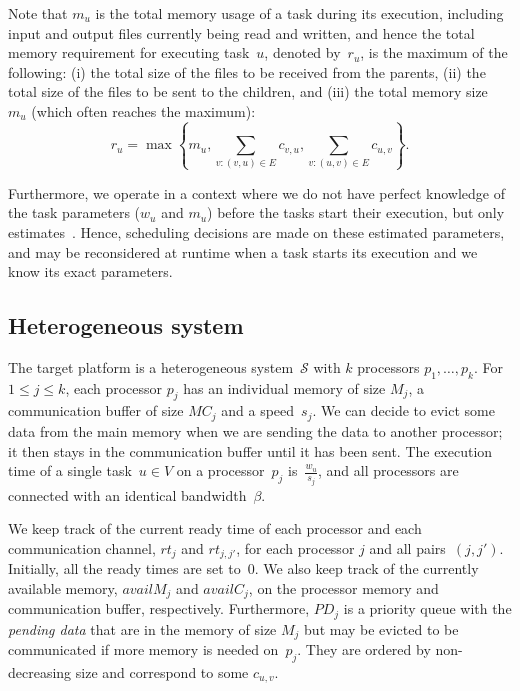 \documentclass[conference]{IEEEtran}
\newcommand{\cluster}{\,\mathcal{S}}
\newcommand{\MM}{M}
\newcommand{\rt}{rt}
\newcommand{\PD}{PD}
\newcommand{\hmey}[1]{{\color{red}[HM: #1]}}
\newcommand{\AB}[1]{{\color{purple}[AB: #1]}}
\begin{document}
Note that $m_u$ is the total memory usage
of a task during its execution, including input and output files currently being read and written,
and hence the total memory requirement for executing task~$u$, denoted by~$r_u$,  is the maximum of the following:
(i) the total size of the files to be received from the parents, (ii) the total size of the files
to be sent to the children, and (iii) the total memory size~$m_u$ (which often reaches the maximum):
\[
    r_u = \max\left\{m_u , \sum_{v:(v,u)\in E}c_{v,u}, \sum_{v:(u,v)\in E} c_{u,v}\right\}.
\]

Furthermore, we operate in a context where we do not have perfect knowledge
of the task parameters ($w_u$ and $m_u$) before the tasks start their execution,
but only estimates~\cite{rahman2013,GARG2015256}.  
Hence, scheduling decisions are made on these estimated parameters, and
may be reconsidered at runtime when a task starts its execution and we know its exact parameters.


\subsection{Heterogeneous system}
\label{sec.mod.plat}
%
The target platform is a heterogeneous system $\cluster$ with $k$ processors 
    $p_1, \dots, p_k$.
    For $1 \leq j \leq k$, each processor $p_j$  has an individual memory of size $M_j$, a communication
    buffer of size $MC_j$ and a speed~$s_j$.
    We can decide to evict some data from the main memory when we are sending the data
    to another processor; it then stays in the communication buffer until it has been sent.
    The execution time of a single task~$u\in V$ on a processor~$p_j$ is~$\frac{w_u}{s_j}$,
    and all 
    processors are connected with an identical bandwidth~$\beta$.

    We keep track of the current ready time of each processor and each communication
    channel, $\rt_j$ and $\rt_{j,j'}$, for each processor $j$ and all pairs~$(j,j')$.
    Initially, all the ready times are set to~$0$.
    We also keep track of the currently available memory, $availM_j$ and $availC_j$,
    on the processor memory and communication buffer, respectively.
    Furthermore, $\PD_j$ is a priority queue with the {\em pending data}
    that are in the memory of size $\MM_j$ but may be evicted to be communicated if
    more memory is needed on~$p_j$. They are ordered by non-decreasing size and
    correspond to some $c_{u,v}$.
\end{document}
